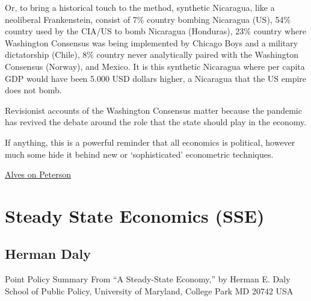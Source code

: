 \documentclass[
]{book}
\begin{document}
Or, to bring a historical touch to the method, synthetic Nicaragua, like a neoliberal Frankenstein, consist of 7\% country bombing Nicaragua (US), 54\% country used by the CIA/US to bomb Nicaragua (Honduras), 23\% country where Washington Consensus was being implemented by Chicago Boys and a military dictatorship (Chile), 8\% country never analytically paired with the Washington Consensus (Norway), and Mexico. It is this synthetic Nicaragua where per capita GDP would have been 5.000 USD dollars higher, a Nicaragua that the US empire does not bomb.

Revisionist accounts of the Washington Consensus matter because the pandemic has revived the debate around the role that the state should play in the economy.

If anything, this is a powerful reminder that all economics is political, however much some hide it behind new or `sophisticated' econometric techniques.

\href{https://developingeconomics.org/2021/04/08/the-washington-counterfactual-dont-believe-the-washington-consensus-resurrection/}{Alves on Peterson}

\hypertarget{steady-state-economics-sse}{%
\chapter{Steady State Economics (SSE)}\label{steady-state-economics-sse}}

\hypertarget{herman-daly}{%
\section{Herman Daly}\label{herman-daly}}

Point Policy Summary
From ``A Steady-State Economy,'' by Herman E. Daly
School of Public Policy, University of Maryland, College Park MD 20742 USA
\end{document}
